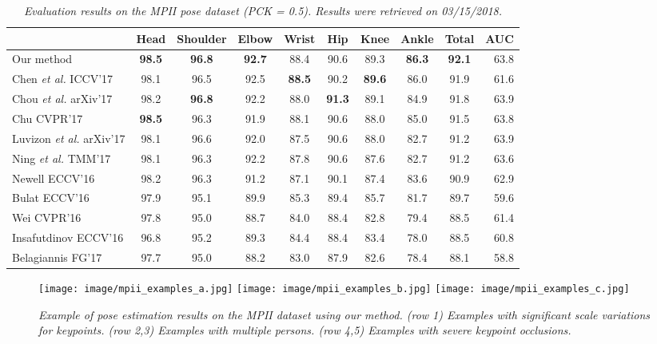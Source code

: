 \documentclass[runningheads]{llncs}
\begin{document}
\begin{table*}[t]
\caption{\em \small 
Evaluation results on the MPII pose dataset (PCK = 0.5). {Results were retrieved on 03/15/2018.}
}
\begin{center}
\begin{tabular}{l||*{8}{c}|r}
 \hline
 &Head & Shoulder & Elbow & Wrist & Hip & Knee  & Ankle & Total & AUC \\
 \hline
Our method& \bf{98.5}  & \bf{96.8}  & \bf{92.7}  & 88.4  & 90.6  & 89.3 & \bf{86.3} & \bf{92.1} &  63.8 \\
\hline
Chen {\em et al.} ICCV'17 \cite{chen2017adversarial} & 98.1  & 96.5  & 92.5  & \bf{88.5}  & 90.2  & \bf{89.6} & 86.0 & 91.9 & 61.6 \\
Chou {\em et al.} arXiv'17 \cite{DBLP:journals/corr/ChouCC17} & 98.2  & \bf{96.8}  & 92.2  & 88.0  & \bf{91.3}  & 89.1 & 84.9 & 91.8 & 63.9 \\
Chu CVPR'17 \cite{chu2017multi} & \bf{98.5}  & 96.3  & 91.9  & 88.1  & 90.6  & 88.0 & 85.0 & 91.5 & 63.8 \\
Luvizon {\em et al.} arXiv'17 \cite{DBLP:journals/corr/abs-1710-02322} & 98.1  & 96.6  & 92.0  & 87.5  & 90.6  & 88.0 & 82.7 & 91.2 & 63.9 \\
Ning {\em et al.} TMM'17 \cite{DBLP:journals/corr/abs-1710-10192} & 98.1  & 96.3  & 92.2  & 87.8  & 90.6  & 87.6 & 82.7 & 91.2 & 63.6 \\
Newell ECCV'16 \cite{newell2016stacked} & 98.2  & 96.3  & 91.2  & 87.1  & 90.1  & 87.4 & 83.6 & 90.9 & 62.9 \\
Bulat ECCV'16 \cite{bulat2016human} & 97.9  & 95.1  & 89.9  & 85.3  & 89.4  & 85.7 & 81.7 & 89.7 & 59.6 \\
Wei CVPR'16 \cite{wei2016convolutional} & 97.8  & 95.0  & 88.7  & 84.0  & 88.4  & 82.8 & 79.4 & 88.5 & 61.4 \\
Insafutdinov ECCV'16 \cite{insafutdinov2016deepercut} & 96.8  & 95.2  & 89.3  & 84.4  & 88.4  & 83.4 & 78.0 & 88.5 & 60.8 \\
Belagiannis FG'17 \cite{belagiannis2017recurrent} & 97.7  & 95.0  & 88.2  & 83.0  & 87.9  & 82.6 & 78.4 & 88.1 & 58.8 \\


\hline
\end{tabular}
\end{center}
\label{table:mpii-pckh5}
\end{table*}

\begin{figure}[t!]
\centering
\texttt{[image: image/mpii\_examples\_a.jpg]}
\texttt{[image: image/mpii\_examples\_b.jpg]}
\texttt{[image: image/mpii\_examples\_c.jpg]}
\caption{\em \small Example of pose estimation results on the MPII dataset using our method. 
(row 1) Examples with significant scale variations for keypoints.
(row 2,3) Examples with multiple persons.
(row 4,5) Examples with severe keypoint occlusions.
}
\label{fig:mpii_example}
\end{figure}	  
\end{document}
